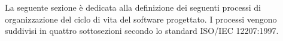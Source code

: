 La seguente sezione è dedicata alla definizione dei seguenti processi di organizzazione del ciclo di vita del software progettato. I processi vengono suddivisi in quattro sottosezioni secondo lo standard ISO/IEC 12207:1997.





